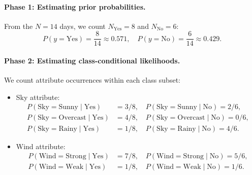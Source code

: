 \paragraph{Phase 1: Estimating prior probabilities.}
From the $N = 14$ days, we count $N_{\text{Yes}} = 8$ and $N_{\text{No}} = 6$:
\begin{equation}
P(y = \text{Yes}) = \frac{8}{14} \approx 0.571, \quad P(y = \text{No}) = \frac{6}{14} \approx 0.429.
\end{equation}

\paragraph{Phase 2: Estimating class-conditional likelihoods.}
We count attribute occurrences within each class subset:
\begin{itemize}[noitemsep]
  \item Sky attribute:
  \begin{align}
  P(\text{Sky}=\text{Sunny} \mid \text{Yes}) &= 3/8, \quad P(\text{Sky}=\text{Sunny} \mid \text{No}) = 2/6, \\
  P(\text{Sky}=\text{Overcast} \mid \text{Yes}) &= 4/8, \quad P(\text{Sky}=\text{Overcast} \mid \text{No}) = 0/6, \\
  P(\text{Sky}=\text{Rainy} \mid \text{Yes}) &= 1/8, \quad P(\text{Sky}=\text{Rainy} \mid \text{No}) = 4/6.
  \end{align}
  \item Wind attribute:
  \begin{align}
  P(\text{Wind}=\text{Strong} \mid \text{Yes}) &= 7/8, \quad P(\text{Wind}=\text{Strong} \mid \text{No}) = 5/6, \\
  P(\text{Wind}=\text{Weak} \mid \text{Yes}) &= 1/8, \quad P(\text{Wind}=\text{Weak} \mid \text{No}) = 1/6.
  \end{align}
\end{itemize}

